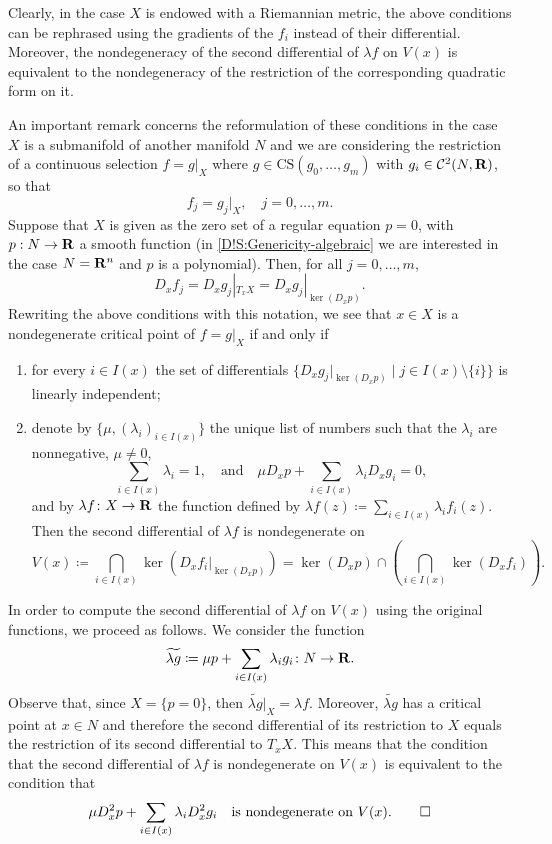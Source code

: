 \begin{definition}
  Clearly, in the case $X$ is endowed with a Riemannian metric, the above conditions can be rephrased using the gradients of the $f_i$ instead of their differential. Moreover, the nondegeneracy of the second differential of $\lambda f$ on $V(x)$ is equivalent to the nondegeneracy of the restriction of the corresponding quadratic form on it.
\end{definition}

\begin{remark}
\label{D!remark:restriction}
  An important remark concerns the reformulation of these conditions in the case $X$ is a submanifold of another manifold $N$ and we are considering the restriction of a continuous selection $f=g|_X$ where $g\in \mathrm{CS}(g_0, \ldots, g_m)$ with $g_i\in \mathcal{C}^2(N, \mathbf{R})$, so that
  $$f_j=g_j|_{X}, \quad j=0, \ldots, m.$$  Suppose that $X$ is given as the zero set of a regular equation $p=0$, with $p:N\to \mathbf{R}$ a smooth function (in \cref{D!S:Genericity-algebraic} we are interested in the case $N=\mathbf{R}^n$ and $p$ is a polynomial). Then, for all $j=0, \ldots, m$,
  $$D_xf_j=D_xg_j|_{T_xX}=D_xg_j|_{\ker(D_xp)}.$$
  Rewriting the above conditions with this notation, we see that $x\in X$ is a nondegenerate critical point of $f=g|_X$ if and only if
  \begin{enumerate}
    \item for every $i\in I(x)$ the set of differentials $\{D_x g_j|_{\ker(D_xp)} \mid j\in I(x)\setminus \{i\}\}$ is linearly independent;
    \item denote by $\{\mu, (\lambda_i)_{i\in I(x)}\}$ the unique list of  numbers such that the $\lambda_i$ are nonnegative, $\mu\neq 0$,
    \[
      \sum_{i \in I(x)} \lambda_i = 1,
      \quad \textrm{and} \quad
      \mu D_xp+\sum_{i \in I(x)} \lambda_i D_x g_i = 0,
    \]
    and by $\lambda f \colon X\to \mathbf{R}$ the function defined by $\lambda f(z)\coloneq\sum_{i\in I(x)}\lambda_if_i(z).$ Then the second differential of $\lambda f$ is nondegenerate on 
    \[
      V(x) \coloneq \bigcap_{i\in I(x)}\ker(D_xf_i|_{\ker(D_xp)})=\ker(D_xp)\cap\left( \bigcap_{i\in I(x)}\ker(D_xf_i)\right).
    \]
  \end{enumerate}
  In order to compute the second differential of $\lambda f$ on $V(x)$ using the original functions, we proceed as follows. We consider the function
  \[
    \widetilde{\lambda g} \coloneq \mu p+\sum_{i\in I(x)}\lambda_ig_i \colon N \to \mathbf{R}.
  \]
  Observe that, since $X=\{p=0\}$, then $\widetilde{\lambda g}|_{X}=\lambda f.$ Moreover, $\widetilde{\lambda g}$ has a critical point at $x\in N$ and therefore the second differential of its restriction to $X$ equals the restriction of its second differential to $T_xX$. This means that the condition that the second differential of $\lambda f$ is nondegenerate on $V(x)$ is equivalent to the condition that
  \[
    \mu D_x^2p+\sum_{i\in I(x)}\lambda_iD_x^2g_i\quad \textrm{is nondegenerate on $V(x)$}.
    \qedhere
  \]
\end{remark}

